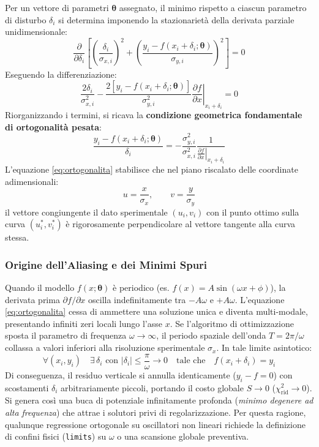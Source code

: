 \documentclass[11pt,a4paper]{article}
\begin{document}
Per un vettore di parametri $\boldsymbol{\theta}$ assegnato, il minimo rispetto a ciascun parametro di disturbo $\delta_i$ si determina imponendo la stazionarietà della derivata parziale unidimensionale:
\begin{equation}
    \frac{\partial}{\partial \delta_i} \left[ \left(\frac{\delta_i}{\sigma_{x, i}}\right)^2 + \left(\frac{y_i - f(x_i + \delta_i; \boldsymbol{\theta})}{\sigma_{y, i}}\right)^2 \right] = 0
\end{equation}
Eseguendo la differenziazione:
\begin{equation}
    \frac{2 \delta_i}{\sigma_{x, i}^2} - \frac{2 [y_i - f(x_i + \delta_i; \boldsymbol{\theta})]}{\sigma_{y, i}^2} \left.\frac{\partial f}{\partial x}\right|_{x_i + \delta_i} = 0
\end{equation}
Riorganizzando i termini, si ricava la \textbf{condizione geometrica fondamentale di ortogonalità pesata}:
\begin{equation}
    \frac{y_i - f(x_i + \delta_i; \boldsymbol{\theta})}{\delta_i} = - \frac{\sigma_{y, i}^2}{\sigma_{x, i}^2} \frac{1}{\left.\frac{\partial f}{\partial x}\right|_{x_i + \delta_i}}
    \label{eq:ortogonalita}
\end{equation}
L'equazione \eqref{eq:ortogonalita} stabilisce che nel piano riscalato delle coordinate adimensionali:
\begin{equation}
    u = \frac{x}{\sigma_x}, \qquad v = \frac{y}{\sigma_y}
\end{equation}
il vettore congiungente il dato sperimentale $(u_i, v_i)$ con il punto ottimo sulla curva $(u_i^*, v_i^*)$ è rigorosamente perpendicolare al vettore tangente alla curva stessa.

\subsubsection{Origine dell'Aliasing e dei Minimi Spuri}
Quando il modello $f(x; \boldsymbol{\theta})$ è periodico (es. $f(x) = A \sin(\omega x + \phi)$), la derivata prima $\partial f / \partial x$ oscilla indefinitamente tra $-A\omega$ e $+A\omega$. 
L'equazione \eqref{eq:ortogonalita} cessa di ammettere una soluzione unica e diventa multi-modale, presentando infiniti zeri locali lungo l'asse $x$. 
Se l'algoritmo di ottimizzazione sposta il parametro di frequenza $\omega \to \infty$, il periodo spaziale dell'onda $T = 2\pi / \omega$ collassa a valori inferiori alla risoluzione sperimentale $\sigma_x$. 
In tale limite asintotico:
\begin{equation}
    \forall (x_i, y_i) \quad \exists \, \delta_i \text{ con } |\delta_i| \le \frac{\pi}{\omega} \to 0 \quad \text{tale che} \quad f(x_i + \delta_i) = y_i
\end{equation}
Di conseguenza, il residuo verticale si annulla identicamente ($y_i - f = 0$) con scostamenti $\delta_i$ arbitrariamente piccoli, portando il costo globale $S \to 0$ ($\chi^2_{\text{rid}} \to 0$). Si genera così una buca di potenziale infinitamente profonda (\emph{minimo degenere ad alta frequenza}) che attrae i solutori privi di regolarizzazione. Per questa ragione, qualunque regressione ortogonale su oscillatori non lineari richiede la definizione di confini fisici (\texttt{limits}) su $\omega$ o una scansione globale preventiva.
\end{document}
